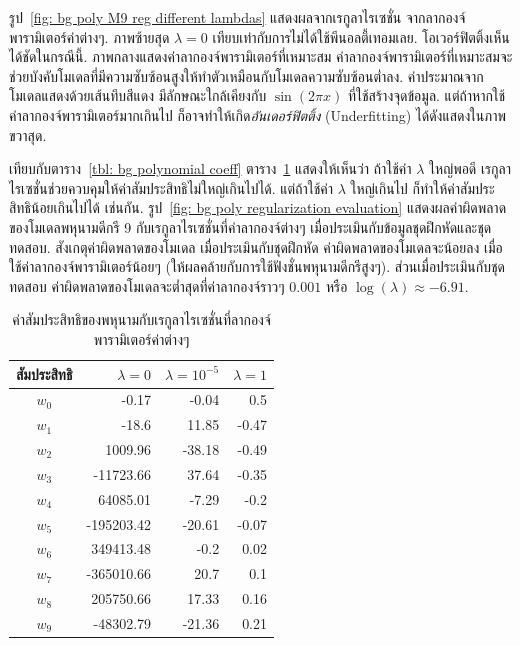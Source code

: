 รูป~\ref{fig: bg poly M9 reg different lambdas} แสดงผลจากเรกูลาไรเซชั่น จากลากองจ์พารามิเตอร์ค่าต่างๆ.
ภาพซ้ายสุด $\lambda = 0$ เทียบเท่ากับการไม่ได้ใช้พีนอลตี้เทอมเลย.
โอเวอร์ฟิตติ้งเห็นได้ชัดในกรณีนี้.
ภาพกลางแสดงค่าลากองจ์พารามิเตอร์ที่เหมาะสม 
ค่าลากองจ์พารามิเตอร์ที่เหมาะสมจะช่วยบังคับโมเดลที่มีความซับซ้อนสูงให้ทำตัวเหมือนกับโมเดลความซับซ้อนต่ำลง.
ค่าประมาณจากโมเดลแสดงด้วยเส้นทึบสีแดง มีลักษณะใกล้เคียงกับ $\sin(2 \pi x)$ ที่ใช้สร้างจุดข้อมูล.
แต่ถ้าหากใช้ค่าลากองจ์พารามิเตอร์มากเกินไป ก็อาจทำให้เกิด\textit{อันเดอร์ฟิตติ้ง} (Underfitting) ได้ดังแสดงในภาพขวาสุด.

เทียบกับตาราง~\ref{tbl: bg polynomial coeff} 
ตาราง~\ref{tbl: bg polynomial coeff regularization} แสดงให้เห็นว่า
ถ้าใช้ค่า $\lambda$ ใหญ่พอดี
เรกูลาไรเซชั่นช่วยควบคุมให้ค่าสัมประสิทธิไม่ใหญ่เกินไปได้.
แต่ถ้าใช้ค่า $\lambda$ ใหญ่เกินไป 
ก็ทำให้ค่าสัมประสิทธิน้อยเกินไปได้ เช่นกัน.
รูป~\ref{fig: bg poly regularization evaluation} แสดงผลค่าผิดพลาดของโมเดลพหุนามดีกรี 9 กับเรกูลาไรเซชั่นที่ค่าลากองจ์ต่างๆ 
เมื่อประเมินกับข้อมูลชุดฝึกหัดและชุดทดสอบ.
สังเกตุค่าผิดพลาดของโมเดล 
เมื่อประเมินกับชุดฝึกหัด ค่าผิดพลาดของโมเดลจะน้อยลง เมื่อใช้ค่าลากองจ์พารามิเตอร์น้อยๆ (ให้ผลคล้ายกับการใช้ฟังชั่นพหุนามดีกรีสูงๆ).
ส่วนเมื่อประเมินกับชุดทดสอบ ค่าผิดพลาดของโมเดลจะต่ำสุดที่ค่าลากองจ์ราวๆ $0.001$ หรือ $\log(\lambda) \approx -6.91$.

\begin{table}[hbtp]
\caption{ค่าสัมประสิทธิของพหุนามกับเรกูลาไรเซชั่นที่ลากองจ์พารามิเตอร์ค่าต่างๆ}
\begin{center}
\begin{tabular}{|c|r|r|r|}
\hline 
%
สัมประสิทธิ & $\lambda = 0$ & $\lambda = 10^{-5}$ & $\lambda = 1$ \\
\hline
$w_0$ & -0.17  & -0.04  & 0.5  \\
$w_1$ & -18.6  & 11.85  & -0.47  \\
$w_2$ & 1009.96  & -38.18  & -0.49  \\
$w_3$ & -11723.66  & 37.64  & -0.35  \\ 
$w_4$ & 64085.01  & -7.29  & -0.2  \\
$w_5$ & -195203.42  & -20.61  & -0.07  \\
$w_6$ & 349413.48  & -0.2  & 0.02  \\
$w_7$ & -365010.66  & 20.7  & 0.1  \\
$w_8$ & 205750.66  & 17.33  & 0.16  \\ 
$w_9$ & -48302.79  & -21.36  & 0.21  \\ 
%
\hline 
\end{tabular} 
\end{center}
\label{tbl: bg polynomial coeff regularization}
\end{table}


